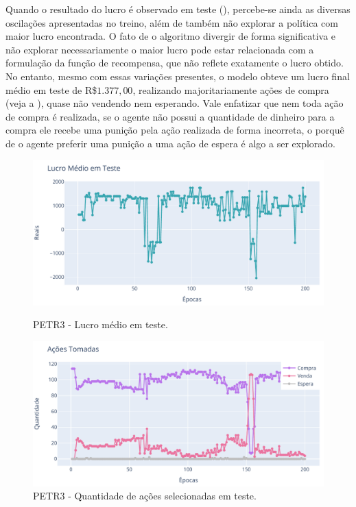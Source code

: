 Quando o resultado do lucro é observado em teste (), percebe-se ainda as diversas oscilações apresentadas no treino, além de também não explorar a política com maior lucro encontrada. O fato de o algoritmo divergir de forma significativa e não explorar necessariamente o maior lucro pode estar relacionada com a formulação da função de recompensa, que não reflete exatamente o lucro obtido. No entanto, mesmo com essas variações presentes, o modelo obteve um lucro final médio em teste de R\$$1.377,00$, realizando majoritariamente ações de compra (veja a ), quase não vendendo nem esperando. Vale enfatizar que nem toda ação de compra é realizada, se o agente não possui a quantidade de dinheiro para a compra ele recebe uma punição pela ação realizada de forma incorreta, o porquê de o agente preferir uma punição a uma ação de espera é algo a ser explorado.

\begin{figure}[htbp]
    \centering 
    \begin{minipage}[b]{0.45\linewidth}
        \includegraphics[width=\linewidth]{img/ddpg/petr3/clean/profit}
        \caption{PETR3 - Lucro médio em teste.} 
        \label{petr_clean_profit}
    \end{minipage}
    \quad
    \begin{minipage}[b]{0.45\linewidth}
        \includegraphics[width=\linewidth]{img/ddpg/petr3/clean/actions}
        \caption{PETR3 - Quantidade de ações selecionadas em teste.}
        \label{petr_clean_act}
    \end{minipage}
\end{figure}

